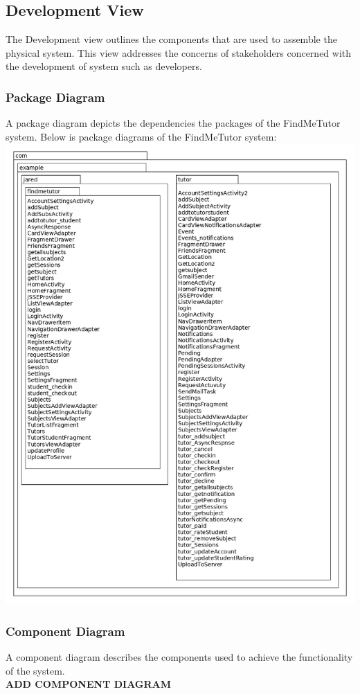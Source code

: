 \documentclass[12pt]{article}
\begin{document}
\newpage

\subsection{Development View}
The Development view outlines the components that are used to assemble the physical system.
This view addresses the concerns of stakeholders concerned with the development of system such as developers.\\
\subsubsection{Package Diagram}

A package diagram depicts the dependencies the packages of the FindMeTutor system.
Below is package diagrams of the FindMeTutor system:\\
\includegraphics[width=140mm]{./package_diagram/package_diagram.png}


\subsubsection{Component Diagram}
A component diagram describes the components used to achieve the functionality of the system.\\
\textbf{ADD COMPONENT DIAGRAM}
\end{document}
